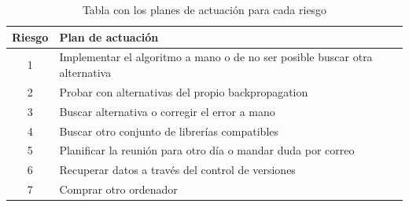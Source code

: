 \begin{table}[H]
\centering
\begin{tabular}{|c|l|}
\hline
\rowcolor[HTML]{C0C0C0} 
{\color[HTML]{000000} \textbf{Riesgo}} & {\color[HTML]{000000} \textbf{Plan de actuación}}                         \\ \hline
\rowcolor[HTML]{EFEFEF} 
{\color[HTML]{000000} 1} & {\color[HTML]{000000} Implementar el algoritmo a mano o de no ser posible buscar otra alternativa} \\ \hline
\rowcolor[HTML]{EFEFEF} 
{\color[HTML]{000000} 2}               & {\color[HTML]{000000} Probar con alternativas del propio backpropagation} \\ \hline
\rowcolor[HTML]{EFEFEF} 
{\color[HTML]{000000} 3}               & {\color[HTML]{000000} Buscar alternativa o corregir el error a mano}      \\ \hline
\rowcolor[HTML]{EFEFEF} 
{\color[HTML]{000000} 4}               & {\color[HTML]{000000} Buscar otro conjunto de librerías compatibles}      \\ \hline
\rowcolor[HTML]{EFEFEF} 
{\color[HTML]{000000} 5} & {\color[HTML]{000000} Planificar la reunión para otro día o mandar duda por correo}                \\ \hline
\rowcolor[HTML]{EFEFEF} 
{\color[HTML]{000000} 6}               & {\color[HTML]{000000} Recuperar datos a través del control de versiones}  \\ \hline
\rowcolor[HTML]{EFEFEF} 
{\color[HTML]{000000} 7}               & {\color[HTML]{000000} Comprar otro ordenador}                             \\ \hline
\end{tabular}
\caption{Tabla con los planes de actuación para cada riesgo}
\end{table}


